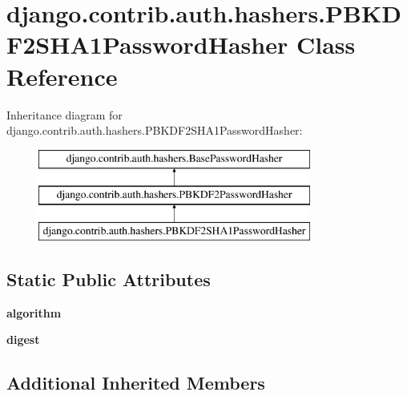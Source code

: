 \hypertarget{classdjango_1_1contrib_1_1auth_1_1hashers_1_1_p_b_k_d_f2_s_h_a1_password_hasher}{}\section{django.\+contrib.\+auth.\+hashers.\+P\+B\+K\+D\+F2\+S\+H\+A1\+Password\+Hasher Class Reference}
\label{classdjango_1_1contrib_1_1auth_1_1hashers_1_1_p_b_k_d_f2_s_h_a1_password_hasher}
Inheritance diagram for django.\+contrib.\+auth.\+hashers.\+P\+B\+K\+D\+F2\+S\+H\+A1\+Password\+Hasher\+:\begin{figure}[H]
\begin{center}
\leavevmode
\includegraphics[height=3.000000cm]{classdjango_1_1contrib_1_1auth_1_1hashers_1_1_p_b_k_d_f2_s_h_a1_password_hasher}
\end{center}
\end{figure}
\subsection*{Static Public Attributes}
\begin{DoxyCompactItemize}
\item 
\mbox{\label{classdjango_1_1contrib_1_1auth_1_1hashers_1_1_p_b_k_d_f2_s_h_a1_password_hasher_a3f181d1b3d170ca20905f7d4588102c5}} 
{\bfseries algorithm}
\item 
\mbox{\label{classdjango_1_1contrib_1_1auth_1_1hashers_1_1_p_b_k_d_f2_s_h_a1_password_hasher_a2a98005bc4177e357d150458ea1d06f3}} 
{\bfseries digest}
\end{DoxyCompactItemize}
\subsection*{Additional Inherited Members}


